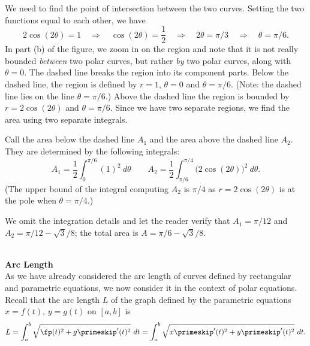 {We need to find the point of intersection between the two curves. Setting the two functions equal to each other, we have
$$2\cos(2\theta) = 1 \quad \Rightarrow \quad \cos(2\theta) = \frac12 \quad \Rightarrow \quad 2\theta = \pi/3\quad \Rightarrow \quad \theta=\pi/6.$$
In part (b) of the figure, we zoom in on the region and note that it is not really bounded \textit{between} two polar curves, but rather \textit{by} two polar curves, along with $\theta=0$. The dashed line breaks the region into its component parts. Below the dashed line, the region is defined by $r=1$, $\theta=0$ and $\theta = \pi/6$. (Note: the dashed line lies on the line $\theta=\pi/6$.) Above the dashed line the region is bounded by $r=2\cos(2\theta)$ and $\theta =\pi/6$. Since we have two separate regions, we find the area using two separate integrals.

Call the area below the dashed line $A_1$ and the area above the dashed line $A_2$. They are determined by the following integrals:
$$A_1 = \frac12\int_0^{\pi/6} (1)^2\ d\theta\qquad  A_2 = \frac12\int_{\pi/6}^{\pi/4} \big(2\cos(2\theta)\big)^2\ d\theta.$$
(The upper bound of the integral computing $A_2$ is $\pi/4$ as $r=2\cos(2\theta)$ is at the pole when $\theta=\pi/4$.)

We omit the integration details and let the reader verify that $A_1 = \pi/12$ and $A_2 = \pi/12-\sqrt{3}/8$; the total area is $A = \pi/6-\sqrt{3}/8$.
}\\

\noindent\textbf{\large Arc Length}\\

As we have already considered the arc length of curves defined by rectangular and parametric equations, we now consider it in the context of polar equations. Recall that the arc length $L$ of the graph defined by the parametric equations $x=f(t)$, $y=g(t)$ on $[a,b]$ is
\begin{equation}L = \int_a^b \sqrt{\fp(t)^2 + g\primeskip'(t)^2}\ dt = \int_a^b \sqrt{x\primeskip'(t)^2+y\primeskip'(t)^2}\ dt.\label{eq:polar_arclength}\end{equation}

